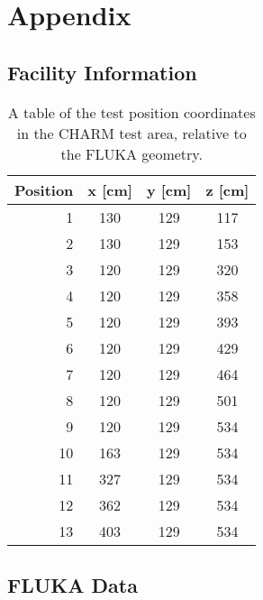 %

\section{Appendix}
\subsection{Facility Information}

\begin{table}[htbp]
  \centering
    \begin{tabular}{r|c|c|c}
    \textbf{Position} & \textbf{x [cm]} & \textbf{y [cm]} & \textbf{z [cm]} \\
    \hline
    \hline
    1     & 130   & 129   & 117 \\
    2     & 130   & 129   & 153 \\
    3     & 120   & 129   & 320 \\
    4     & 120   & 129   & 358 \\
    5     & 120   & 129   & 393 \\
    6     & 120   & 129   & 429 \\
    7     & 120   & 129   & 464 \\
    8     & 120   & 129   & 501 \\
    9     & 120   & 129   & 534 \\
    10    & 163   & 129   & 534 \\
    11    & 327   & 129   & 534 \\
    12    & 362   & 129   & 534 \\
    13    & 403   & 129   & 534 \\
    \end{tabular}%
    \label{tab:charm_test_pos}
    \caption{A table of the test position coordinates in the CHARM test area, relative to the FLUKA geometry.}
  \label{tab:test_positions}%
\end{table}%

\subsection{FLUKA Data}


